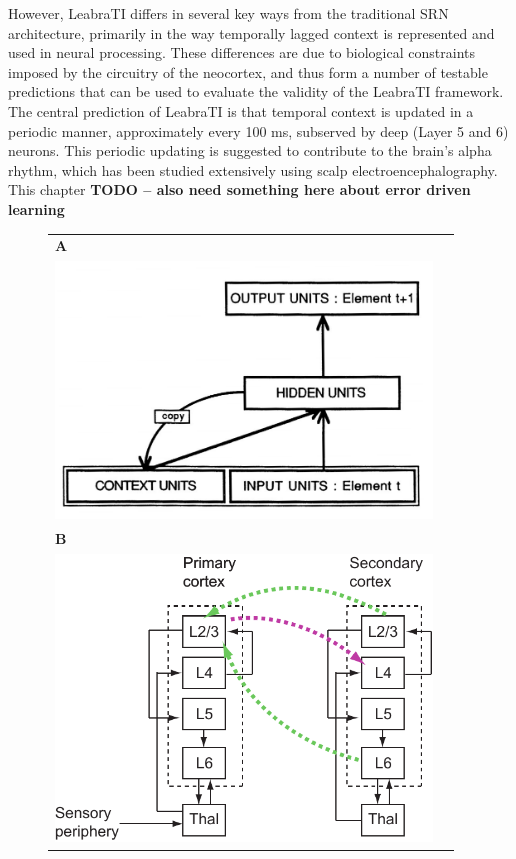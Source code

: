 \documentclass[dwyatte_dissertation.tex]{subfiles}
\begin{document}
However, LeabraTI differs in several key ways from the traditional SRN architecture, primarily in the way temporally lagged context is represented and used in neural processing. These differences are due to biological constraints imposed by the circuitry of the neocortex, and thus form a number of testable predictions that can be used to evaluate the validity of the LeabraTI framework. The central prediction of LeabraTI is that temporal context is updated in a periodic manner, approximately every 100 ms, subserved by deep (Layer 5 and 6) neurons. This periodic updating is suggested to contribute to the brain's alpha rhythm, which has been studied extensively using scalp electroencephalography. This chapter \textbf{TODO -- also need something here about error driven learning}

\begin{figure}[h!]
\begin{center}
\begin{tabular}{ll}
\textbf{A} \\
\includegraphics[width=100mm]{figs/chap_leabrati/srn_scm.png} \\
\textbf{B} \\
\includegraphics[width=100mm]{figs/chap_leabrati/microcircuit_horiz.pdf} \\

\end{tabular}
\end{center}
\end{figure}
\end{document}
